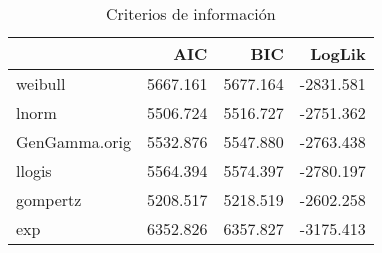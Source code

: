 \begin{table}

\caption{Criterios de información}
\centering
\begin{tabular}[t]{l|r|r|r}
\hline
  & AIC & BIC & LogLik\\
\hline
weibull & 5667.161 & 5677.164 & -2831.581\\
\hline
lnorm & 5506.724 & 5516.727 & -2751.362\\
\hline
GenGamma.orig & 5532.876 & 5547.880 & -2763.438\\
\hline
llogis & 5564.394 & 5574.397 & -2780.197\\
\hline
gompertz & 5208.517 & 5218.519 & -2602.258\\
\hline
exp & 6352.826 & 6357.827 & -3175.413\\
\hline
\end{tabular}
\end{table}
